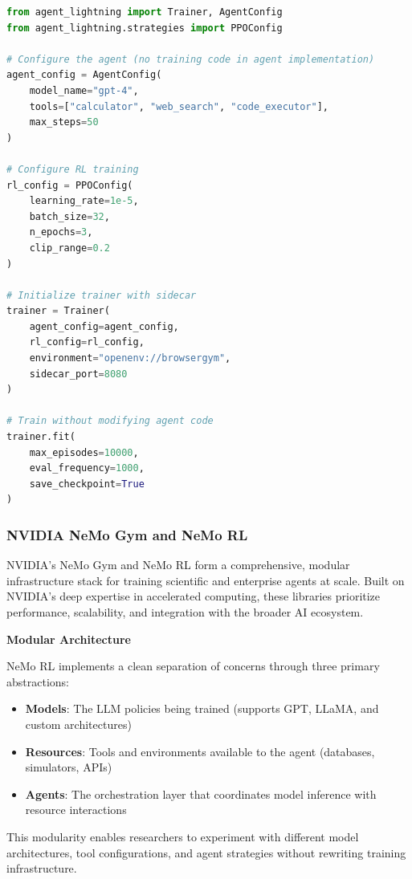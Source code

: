 \begin{lstlisting}[language=Python]
from agent_lightning import Trainer, AgentConfig
from agent_lightning.strategies import PPOConfig

# Configure the agent (no training code in agent implementation)
agent_config = AgentConfig(
    model_name="gpt-4",
    tools=["calculator", "web_search", "code_executor"],
    max_steps=50
)

# Configure RL training
rl_config = PPOConfig(
    learning_rate=1e-5,
    batch_size=32,
    n_epochs=3,
    clip_range=0.2
)

# Initialize trainer with sidecar
trainer = Trainer(
    agent_config=agent_config,
    rl_config=rl_config,
    environment="openenv://browsergym",
    sidecar_port=8080
)

# Train without modifying agent code
trainer.fit(
    max_episodes=10000,
    eval_frequency=1000,
    save_checkpoint=True
)
\end{lstlisting}

\subsubsection{NVIDIA NeMo Gym and NeMo RL}

NVIDIA's NeMo Gym and NeMo RL form a comprehensive, modular infrastructure stack for training scientific and enterprise agents at scale. Built on NVIDIA's deep expertise in accelerated computing, these libraries prioritize performance, scalability, and integration with the broader AI ecosystem.

\textbf{Modular Architecture}

NeMo RL implements a clean separation of concerns through three primary abstractions:

\begin{itemize}
    \item \textbf{Models}: The LLM policies being trained (supports GPT, LLaMA, and custom architectures)
    \item \textbf{Resources}: Tools and environments available to the agent (databases, simulators, APIs)
    \item \textbf{Agents}: The orchestration layer that coordinates model inference with resource interactions

\end{itemize}
This modularity enables researchers to experiment with different model architectures, tool configurations, and agent strategies without rewriting training infrastructure.

